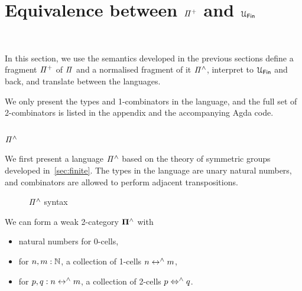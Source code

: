 \section{Equivalence between \texorpdfstring{$\mathit{{\Pi}^{+}}$}{Pi} and \texorpdfstring{$\UFin$}{UFin}}~\label{sec:equivalence}

In this section, we use the semantics developed in the previous sections define a fragment $\mathit{{\Pi}^{+}}$ of $\mathit{\Pi}$
and a normalised fragment of it $\mathit{{\Pi}^{\wedge}}$, interpret to $\UFin$ and back, and translate between the languages.

We only present the types and 1-combinators in the language, and the full set of 2-combinators is listed in the appendix
and the accompanying Agda code.



\subsection{$\mathit{{\Pi}^{\wedge}}$}

We first present a language $\mathit{{\Pi}^{\wedge}}$ based on the theory of symmetric groups developed in~\cref{sec:finite}. The
types in the language are unary natural numbers, and combinators are allowed to perform adjacent transpositions.

\begin{figure}[t]
  {}

  {}
  \caption{$\mathit{{\Pi}^{\wedge}}$ syntax}
  \label{fig:pihat}
\end{figure}

\begin{proposition}
  We can form a weak 2-category $\mathbf{\Pi^{\wedge}}$ with
  \begin{itemize}
    \item natural numbers for 0-cells,
    \item for $n, m : \mathbb{N}$, a collection of 1-cells $n \mathrel{\leftrightarrow^{\wedge}} m$,
    \item for $p, q : n \mathrel{\leftrightarrow^{\wedge}} m$, a collection of 2-cells $p \mathrel{\Leftrightarrow^{\wedge}} q$.
  \end{itemize}
\end{proposition}

